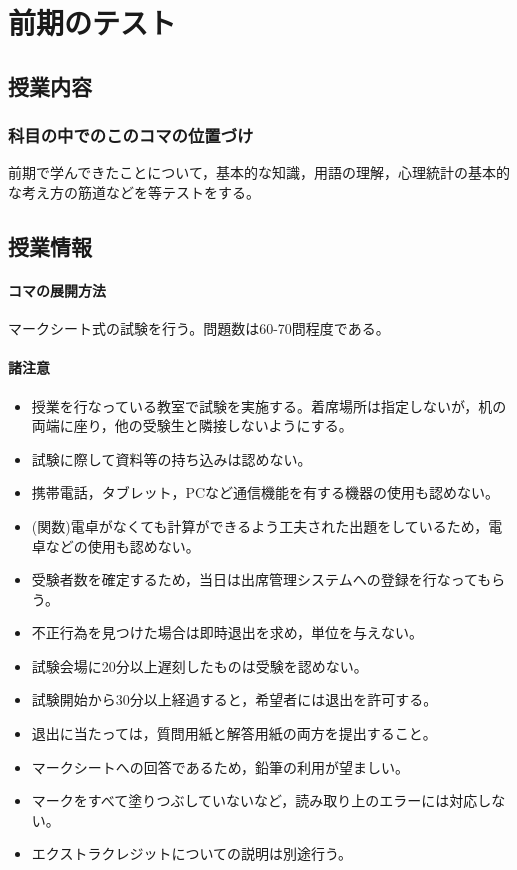 \section{前期のテスト}
\label{s15_FirstSemester}

\subsection{授業内容}
\subsubsection{科目の中でのこのコマの位置づけ}
前期で学んできたことについて，基本的な知識，用語の理解，心理統計の基本的な考え方の筋道などを等テストをする。
\subsection{授業情報}
\paragraph{コマの展開方法}
マークシート式の試験を行う。問題数は60-70問程度である。
\paragraph{諸注意}
\begin{itemize}
	\item 授業を行なっている教室で試験を実施する。着席場所は指定しないが，机の両端に座り，他の受験生と隣接しないようにする。
	\item 試験に際して資料等の持ち込みは認めない。
	\item 携帯電話，タブレット，PCなど通信機能を有する機器の使用も認めない。
	\item (関数)電卓がなくても計算ができるよう工夫された出題をしているため，電卓などの使用も認めない。
	\item 受験者数を確定するため，当日は出席管理システムへの登録を行なってもらう。
	\item 不正行為を見つけた場合は即時退出を求め，単位を与えない。
	\item 試験会場に20分以上遅刻したものは受験を認めない。
	\item 試験開始から30分以上経過すると，希望者には退出を許可する。
	\item 退出に当たっては，質問用紙と解答用紙の両方を提出すること。
	\item マークシートへの回答であるため，鉛筆の利用が望ましい。
	\item マークをすべて塗りつぶしていないなど，読み取り上のエラーには対応しない。
	\item エクストラクレジットについての説明は別途行う。
\end{itemize}
